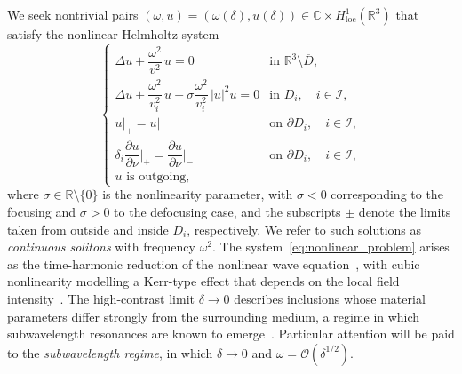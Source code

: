 \documentclass[a4paper,reqno,twoside]{amsart}
\numberwithin{equation}{section}
\theoremstyle{definition}
\newtheorem{remark}[theorem]{Remark}
\newcommand{\<}{\ensuremath \leq}
\renewcommand{\>}{\ensuremath \geq}
\begin{document}
We seek nontrivial pairs $(\omega, u) = (\omega(\delta), u(\delta)) \in \mathbb{C} \times H^1_{\mathrm{loc}}(\mathbb{R}^3)$ that satisfy the nonlinear Helmholtz system
\begin{equation}\label{eq:nonlinear_problem}
    \begin{cases}
        \Delta u + \dfrac{\omega^2}{v^2}\, u = 0
        & \text{in } \mathbb{R}^3 \setminus \overline{D}, \\[0.8em]
        \Delta u + \dfrac{\omega^2}{v_i^2}\, u
        + \sigma \dfrac{\omega^2}{v_i^2}\, |u|^2 u = 0
        & \text{in } D_i, \quad i \in \mathcal{I}, \\[0.8em]
        u\big|_+ = u\big|_-
        & \text{on } \partial D_i, \quad i \in \mathcal{I}, \\[0.8em]
        \delta_i \dfrac{\partial u}{\partial \nu}\bigg|_+
        = \dfrac{\partial u}{\partial \nu}\bigg|_-
        & \text{on } \partial D_i, \quad i \in \mathcal{I}, \\[0.8em]
        u \text{ is outgoing,}
    \end{cases}
\end{equation}
where $\sigma \in \mathbb{R}\setminus\{0\}$ is the nonlinearity parameter, with $\sigma < 0$ corresponding to the focusing and $\sigma > 0$ to the defocusing case, and the subscripts $\pm$ denote the limits taken from outside and inside $D_i$, respectively. We refer to such solutions as \emph{continuous solitons} with frequency $\omega^2$. The system~\eqref{eq:nonlinear_problem} arises as the time-harmonic reduction of the nonlinear wave equation~\cite{ammari2025analysis}, with cubic nonlinearity modelling a Kerr-type effect that depends on the local field intensity~\cite{gorbach2009spatial}. The high-contrast limit $\delta \to 0$ describes inclusions whose material parameters differ strongly from the surrounding medium, a regime in which subwavelength resonances are known to emerge~\cite{ammari2025analysis}. Particular attention will be paid to the \emph{subwavelength regime}, in which $\delta \to 0$ and $\omega = \mathcal{O}(\delta^{1/2})$.



\end{document}
